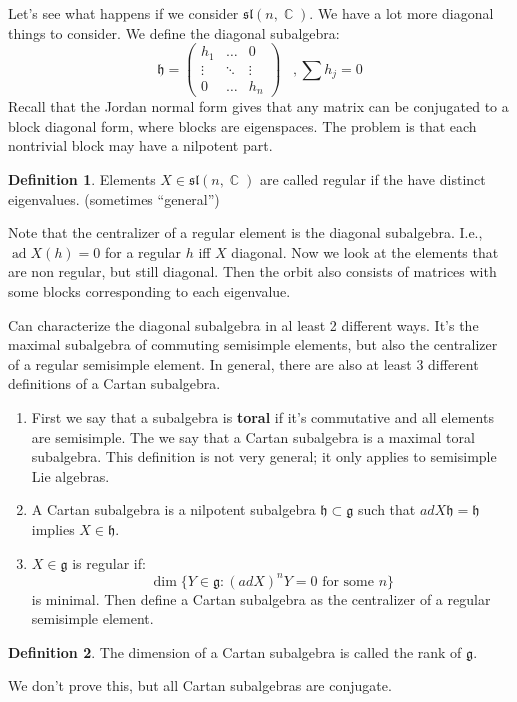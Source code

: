 \documentclass[12 pt]{article}
\DeclareMathOperator {\C} {\mathbb{C}}
\DeclareMathOperator {\ad} {ad}
\theoremstyle{plain}
\theoremstyle{definition}
\newtheorem{defn}{Definition}
\theoremstyle{remark}
\begin{document}
Let's see what happens if we consider $\mathfrak{sl}(n,\C)$. We have a lot more diagonal things to consider. We define the diagonal subalgebra:
\[      \mathfrak{h} =     \left(\begin{array} {ccc}  h_1 & \dots & 0  \\ \vdots & \ddots & \vdots \\ 0 & \dots & h_n \end{array} \right) \;\;\;, \sum h_j = 0  \]
Recall that the Jordan normal form gives that any matrix can be conjugated to a block diagonal form, where blocks are eigenspaces. The problem is that each nontrivial block may have a nilpotent part.
\begin{defn}
Elements $X \in \mathfrak{sl}(n,\C)$ are called regular if the have distinct eigenvalues. (sometimes ``general'')
\end{defn}
Note that the centralizer of a regular element is the diagonal subalgebra. I.e., $\ad X(h) = 0$ for a regular $h$ iff $X$ diagonal. Now we look at the elements that are non regular, but still diagonal. Then the orbit also consists of matrices with some blocks corresponding to each eigenvalue.

Can characterize the diagonal subalgebra in al least 2 different ways. It's the maximal subalgebra of commuting semisimple elements, but also the centralizer of a regular semisimple element. In general, there are also at least 3 different definitions of a Cartan subalgebra. 
\begin{enumerate}
\item First we say that a subalgebra is \textbf{toral} if it's commutative and all elements are semisimple. The we say that a Cartan subalgebra is a maximal toral subalgebra. This definition is not very general; it only applies to semisimple Lie algebras.
\item A Cartan subalgebra is a nilpotent subalgebra $\mathfrak{h} \subset \mathfrak{g}$ such that $ad X \mathfrak{h} = \mathfrak{h}$ implies $X \in \mathfrak{h}$.
\item $X \in \mathfrak{g}$ is regular if:
\[    \dim \{  Y \in \mathfrak{g} : (ad X)^n Y = 0 \text{ for some } n \}   \]
is minimal. Then define a Cartan subalgebra as the centralizer of a regular semisimple element.
\end{enumerate}
\begin{defn}
The dimension of a Cartan subalgebra is called the rank of $\mathfrak{g}$.
\end{defn}
We don't prove this, but all Cartan subalgebras are conjugate.
\end{document}
